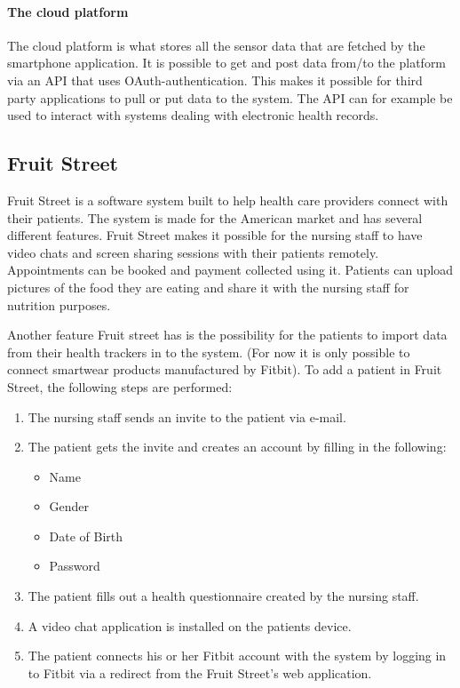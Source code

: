 \documentclass{cslthse-msc}
\begin{document}
\paragraph{The cloud platform} The cloud platform is what stores all the sensor data that are fetched by the smartphone application. It is possible to get and post data from/to the platform via an API that uses OAuth-authentication. This makes it possible for third party applications to pull or put data to the system. The API can for example be used to interact with systems dealing with electronic health records\cite{tactio2014}\cite{TactioWebsite}.


\subsection{Fruit Street}

Fruit Street is a software system built to help health care providers connect with their patients. The system is made for the American market and has several different features. Fruit Street makes it possible for the nursing staff to have video chats and screen sharing sessions with their patients remotely. Appointments can be booked and payment collected using it. Patients can upload pictures of the food they are eating and share it with the nursing staff for nutrition purposes. 

Another feature Fruit street has is the possibility for the patients to import data from their health trackers\cite{FruitStreet} in to the system. (For now it is only possible to connect smartwear products manufactured by Fitbit). To add a patient in Fruit Street, the following steps are performed:

\begin{enumerate}
    \item The nursing staff sends an invite to the patient via e-mail.
    \item The patient gets the invite and creates an account by filling in the following:
\begin{itemize}
    \item Name
    \item Gender
    \item Date of Birth
    \item Password
\end{itemize}
    \item The patient fills out a health questionnaire created by the nursing staff.
    \item A video chat application is installed on the patients device.
    \item The patient connects his or her Fitbit account with the system by logging in to Fitbit via a redirect from the Fruit Street's web application.
\end{enumerate}
\end{document}
